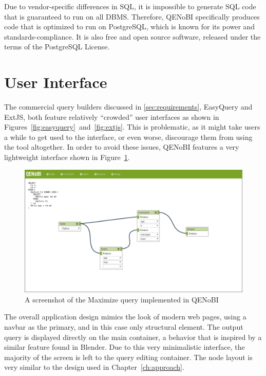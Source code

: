 \documentclass[11pt,a4paper]{globis-book}
\begin{document}
Due to vendor-specific differences in SQL, it is impossible to generate SQL code that is guaranteed to run on all DBMS. Therefore, QENoBI specifically produces code that is optimized to run on PostgreSQL, which is known for its power and standards-compliance. It is also free and open source software, released under the terms of the PostgreSQL License.

\section{User Interface}
The commercial query builders discussed in \ref{sec:requirements}, EasyQuery and ExtJS, both feature relatively ``crowded'' user interfaces as shown in Figures~\ref{fig:easyquery}~and~\ref{fig:extjs}. This is problematic, as it might take users a while to get used to the interface, or even worse, discourage them from using the tool altogether. In order to avoid these issues, QENoBI features a very lightweight interface shown in Figure~\ref{fig:qenobi}.

\begin{figure}[h]
  \centering
  \includegraphics[width=\textwidth]{resources/QENoBI.png}
  \caption{A screenshot of the Maximize query implemented in QENoBI}
  \label{fig:qenobi}
\end{figure}

The overall application design mimics the look of modern web pages, using a navbar as the primary, and in this case only structural element. The output query is displayed directly on the main container, a behavior that is inspired by a similar feature found in Blender. Due to this very minimalistic interface, the majority of the screen is left to the query editing container. The node layout is very similar to the design used in Chapter~\ref{ch:approach}.
\end{document}
